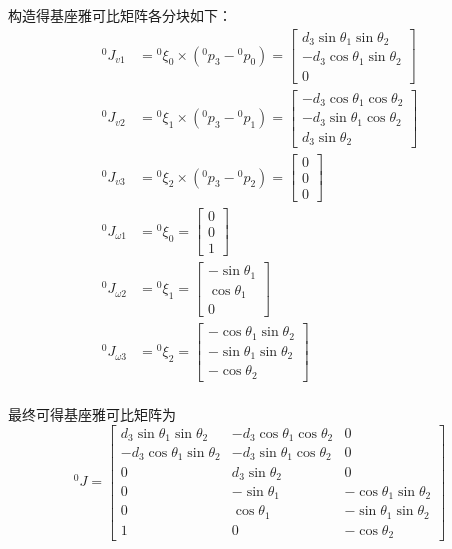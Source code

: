 \documentclass[UTF8, 13pt]{ctexart}
\begin{document}
构造得基座雅可比矩阵各分块如下：
\[
\begin{aligned}
    {}^0 J_{v1} &= {}^0\xi_0 \times ({}^0 p_3 - {}^0 p_0)
                = \begin{bmatrix}
                    d_3 \sin\theta_1 \sin\theta_2 \\
                    -d_3 \cos\theta_1 \sin\theta_2 \\
                    0
                \end{bmatrix} \\
    {}^0 J_{v2} &= {}^0\xi_1 \times ({}^0 p_3 - {}^0 p_1)
                = \begin{bmatrix}
                    -d_3 \cos\theta_1 \cos\theta_2 \\
                    -d_3 \sin\theta_1 \cos\theta_2 \\
                    d_3 \sin\theta_2
                \end{bmatrix} \\
    {}^0 J_{v3} &= {}^0\xi_2 \times ({}^0 p_3 - {}^0 p_2)
                = \begin{bmatrix}
                    0 \\
                    0 \\
                    0
                \end{bmatrix} \\
    {}^0 J_{\omega1} &= {}^0\xi_0
                = \begin{bmatrix}
                    0 \\ 0 \\ 1
                \end{bmatrix} \\
    {}^0 J_{\omega2} &= {}^0\xi_1
                = \begin{bmatrix}
                    -\sin\theta_1 \\ \cos\theta_1 \\ 0
                \end{bmatrix} \\
    {}^0 J_{\omega3} &= {}^0\xi_2
                = \begin{bmatrix}
                    -\cos\theta_1 \sin\theta_2 \\ -\sin\theta_1 \sin\theta_2 \\ -\cos\theta_2
                \end{bmatrix} \\
\end{aligned}
\]

最终可得基座雅可比矩阵为
\[
{}^0 J =
\begin{bmatrix}
    d_3 \sin\theta_1 \sin\theta_2 & -d_3 \cos\theta_1 \cos\theta_2 & 0 \\
    -d_3 \cos\theta_1 \sin\theta_2 & -d_3 \sin\theta_1 \cos\theta_2 & 0 \\
    0 & d_3 \sin\theta_2 & 0 \\
    0 & -\sin\theta_1 & -\cos\theta_1 \sin\theta_2 \\
    0 & \cos\theta_1 & -\sin\theta_1 \sin\theta_2 \\
    1 & 0 & -\cos\theta_2
\end{bmatrix}
\]
\vspace{5em}
\end{document}
